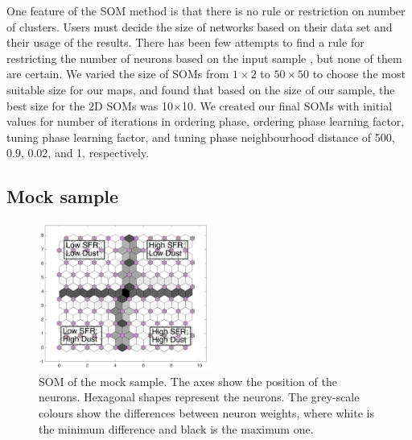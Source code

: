      One feature of the SOM method is that there is no rule or restriction on number of clusters.
     Users must decide the size of networks based on their data set and their usage of the results.
     There has been few attempts to find a rule for restricting the number of neurons based on the input sample \citep[e.g.][]{Vesanto05}, but none of them are certain. 
     We varied the size of SOMs from $1\times2$ to $50\times50$ to choose the most suitable size for our maps, and found that based on the size of our sample, the best size for the 2D SOMs was 10$\times$10. 
     We created our final SOMs with initial values for number of iterations in ordering phase, ordering phase learning factor, tuning phase learning factor, and tuning phase neighbourhood distance of 500, 0.9, 0.02, and 1, respectively. 
     
    
\subsection{Mock sample}
\label{sec: mock_sample}
 
         \begin{figure}
                \centering
                \includegraphics[width=0.5\textwidth]{../images0.01/mock_sample.png}
            \caption{SOM of the mock sample. The axes show the position of the neurons. Hexagonal shapes represent the neurons. The grey-scale colours show the differences between neuron weights, where white is the minimum difference and black is the maximum one.}
            \label{fig: sample}
        \end{figure}
 
